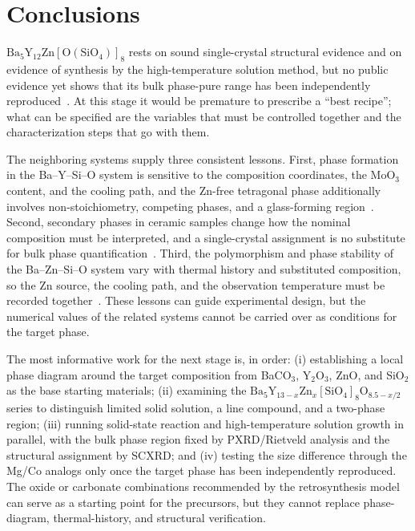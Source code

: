 \section{Conclusions}
\label{sec:transferability}

$\mathrm{Ba_5Y_{12}Zn[O(SiO_4)]_8}$ rests on sound single-crystal structural evidence and on evidence of synthesis by the high-temperature solution method, but no public evidence yet shows that its bulk phase-pure range has been independently reproduced~\cite{ababaikeri2024ba5y12zn}. At this stage it would be premature to prescribe a ``best recipe''; what can be specified are the variables that must be controlled together and the characterization steps that go with them.

The neighboring systems supply three consistent lessons. First, phase formation in the Ba--Y--Si--O system is sensitive to the composition coordinates, the MoO$_3$ content, and the cooling path, and the Zn-free tetragonal phase additionally involves non-stoichiometry, competing phases, and a glass-forming region~\cite{wierzbickawieczorek2017high,yamane2024synthesis,gulay2024navigation}. Second, secondary phases in ceramic samples change how the nominal composition must be interpreted, and a single-crystal assignment is no substitute for bulk phase quantification~\cite{yamane2024microstructure}. Third, the polymorphism and phase stability of the Ba--Zn--Si--O system vary with thermal history and substituted composition, so the Zn source, the cooling path, and the observation temperature must be recorded together~\cite{lin1999phase,kerstan2013bazn2si2o7,zou2019anti}. These lessons can guide experimental design, but the numerical values of the related systems cannot be carried over as conditions for the target phase.

The most informative work for the next stage is, in order: (i) establishing a local phase diagram around the target composition from BaCO$_3$, Y$_2$O$_3$, ZnO, and SiO$_2$ as the base starting materials; (ii) examining the $\mathrm{Ba_5Y_{13-\mathit{x}}Zn_{\mathit{x}}[SiO_4]_8O_{8.5-\mathit{x}/2}}$ series to distinguish limited solid solution, a line compound, and a two-phase region; (iii) running solid-state reaction and high-temperature solution growth in parallel, with the bulk phase region fixed by PXRD\slash Rietveld analysis and the structural assignment by SCXRD; and (iv) testing the size difference through the Mg\slash Co analogs only once the target phase has been independently reproduced. The oxide or carbonate combinations recommended by the retrosynthesis model can serve as a starting point for the precursors, but they cannot replace phase-diagram, thermal-history, and structural verification.

